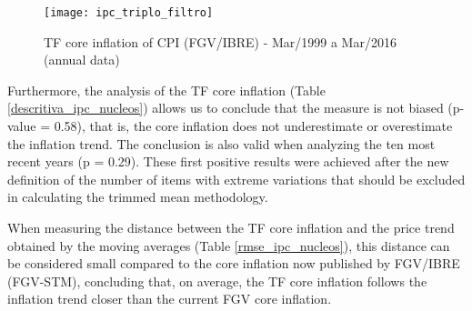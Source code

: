\documentclass[10pt]{article}
\begin{document}

\begin{figure}[h]
  \centering
  \texttt{[image: ipc\_triplo\_filtro]}
  \caption{TF core inflation of CPI (FGV/IBRE) - Mar/1999 a Mar/2016 (annual data)}
  \label{ipc_nucleo}
\end{figure}

Furthermore, the analysis of the TF core inflation (Table \ref{descritiva_ipc_nucleos}) allows us to conclude that the measure is not biased (p-value = 0.58), that is, the core inflation does not underestimate or overestimate the inflation trend. The conclusion is also valid when analyzing the ten most recent years (p = 0.29). These first positive results were achieved after the new definition of the number of items with extreme variations that should be excluded in calculating the trimmed mean methodology.


When measuring the distance between the TF core inflation and the price trend obtained by the moving averages (Table \ref{rmse_ipc_nucleos}), this distance can be considered small compared to the core inflation now published by FGV/IBRE (FGV-STM), concluding that, on average, the TF core inflation follows the inflation  trend closer than the current FGV core inflation.

\end{document}
